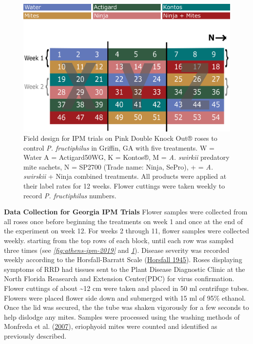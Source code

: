 \documentclass{ufdissertation}[overrideChapters] %
\begin{document}
{\begin{figure}
{\centering \includegraphics[width=1\linewidth]{figure/rrv_ipm_plot_map_2019_griffin} 

}

\caption[Field design for IPM trials on Pink Double Knock Out® roses to control \textit{P. fructiphilus} in Griffin, GA with five treatments]{Field design for IPM trials on Pink Double Knock Out® roses to control \textit{P. fructiphilus} in Griffin, GA with five treatments. W = Water A = Actigard50WG, K = Kontos®, M = \textit{A. swirkii} predatory mite sachets, N = SP2700 (Trade name: Ninja, SePro), + = \textit{A. swirskii} + Ninja combined treatments. All products were applied at their label rates for 12 weeks. Flower cuttings were taken weekly to record \textit{P. fructiphilus} numbers.}\label{fig:griff-ipm-2019}
\end{figure}
\textbf{Data Collection for Georgia IPM Trials}
Flower samples were collected from all roses once before beginning the treatments on week 1 and once at the end of the experiment on week 12. For weeks 2 through 11, flower samples were collected weekly. starting from the top rows of each block, until each row was sampled three times (see \emph{\ref{fig:athens-ipm-2019}} and \emph{\ref{fig:griff-ipm-2019}}). Disease severity was recorded weekly according to the Horsfall-Barratt Scale (\protect\hyperlink{ref-Horsfall1945}{Horsfall 1945}). Roses displaying symptoms of RRD had tissues sent to the Plant Disease Diagnostic Clinic at the North Florida Reasearch and Extension Center(PDC) for virus confirmation. Flower cuttings of about \textasciitilde12 cm were taken and placed in 50 ml centrifuge tubes. Flowers were placed flower side down and submerged with 15 ml of 95\% ethanol. Once the lid was secured, the the tube was shaken vigorously for a few seconds to help dislodge any mites. Samples were processed using the washing methods of Monfreda et al. (\protect\hyperlink{ref-Monfreda2007}{2007}), eriophyoid mites were counted and identified as previously described.

}
\end{document}
